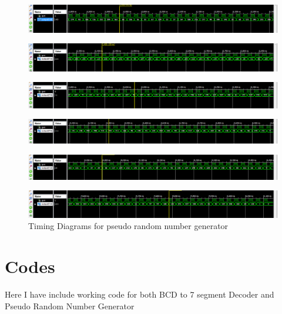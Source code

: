 \documentclass[12pt]{article}
\begin{document}
\begin{figure}[!ht]
\centering
\includegraphics[scale=0.5]{Capture3}
\end{figure}
\begin{figure}[!ht]
\centering
\includegraphics[scale=0.5]{Capture4}
\end{figure}
\begin{figure}[!ht]
\centering
\includegraphics[scale=0.5]{Capture5}
\end{figure}
\begin{figure}[!ht]
\centering
\includegraphics[scale=0.5]{Capture6}
\end{figure}
\begin{figure}[!ht]
\centering
\includegraphics[scale=0.5]{Capture7}
\end{figure}
\begin{figure}[!ht]
\centering
\includegraphics[scale=0.5]{Capture8}
\caption{Timing Diagrams for pseudo random number generator}
\label{fig2}
\end{figure}
\newpage
\section{Codes}
Here I have include working code for both BCD to 7 segment Decoder and Pseudo Random Number Generator
\end{document}
